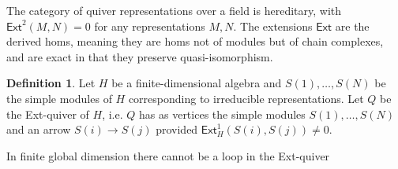 \documentclass{article}
\theoremstyle{definition}
\newtheorem{definition}{Definition}[section]
\begin{document}
The category of quiver representations over a field is hereditary, with $\mathsf{Ext}^2(M, N)=0$ for any representations $M, N$. The extensions $\mathsf{Ext}$ are the derived homs, meaning they are homs not of modules but of chain complexes, and are exact in that they preserve quasi-isomorphism. 

\begin{definition}
    Let $H$ be a finite-dimensional algebra and $S(1),\dots,S(N)$ be the simple modules of $H$ corresponding to irreducible representations. Let $Q$ be the Ext-quiver of $H$, i.e. $Q$ has as vertices the simple modules $S(1),\dots, S(N)$ and an arrow $S(i) \to S(j)$ provided $\mathsf{Ext}^1_H(S(i),S(j)) \neq 0$.
\end{definition} 

In finite global dimension there cannot be a loop in the Ext-quiver




\printbibliography


\end{document}
